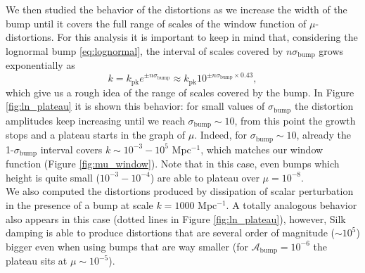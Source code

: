 We then studied the behavior of the distortions as we increase the width of the bump until it covers the full range of scales of the window function of $\mu$-distortions. For this analysis it is important to keep in mind that, considering the lognormal bump \eqref{eq:lognormal}, the interval of scales covered by $n\sigma_\text{bump}$ grows exponentially as
$$k=k_\text{pk}e^{\pm n\sigma_\text{bump}}\approx k_\text{pk}10^{\pm n\sigma_\text{bump}\times 0.43},$$
which give us a rough idea of the range of scales covered by the bump. In Figure \ref{fig:ln_plateau} it is shown this behavior: for small values of $\sigma_\text{bump}$ the distortion amplitudes keep increasing until we reach $\sigma_\text{bump}\sim10$, from this point the growth stops and a plateau starts in the graph of $\mu$. Indeed, for $\sigma_\text{bump}\sim10$, already the 1-$\sigma_\text{bump}$ interval covers $k\sim 10^{-3}-10^{5}$ Mpc$^{-1}$, which matches our window function (Figure \ref{fig:mu_window}). Note that in this case, even bumps which height is quite small ($10^{-3}-10^{-4}$) are able to plateau over $\mu=10^{-8}$.\\
We also computed the distortions produced by dissipation of scalar perturbation in the presence of a bump at scale $k=1000$ Mpc$^{-1}$. A totally analogous behavior also appears in this case (dotted lines in Figure \ref{fig:ln_plateau}), however, Silk damping is able to produce distortions that are several order of magnitude ($\sim10^5$) bigger even when using bumps that are way smaller (for $\mathcal A_\text{bump}=10^{-6}$ the plateau sits at $\mu\sim 10^{-5}$).

